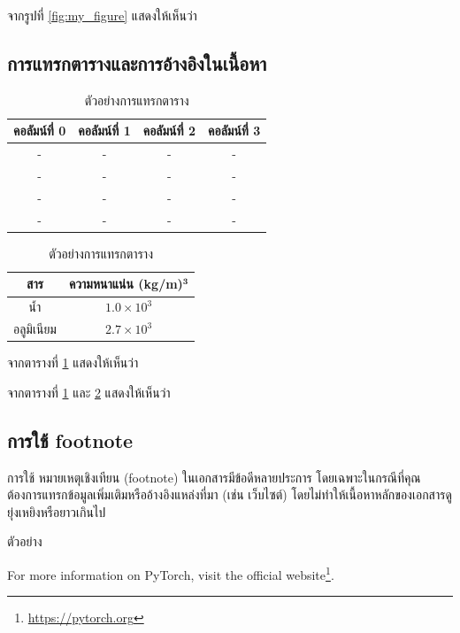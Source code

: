 จากรูปที่ \ref{fig:my_figure} แสดงให้เห็นว่า \dotfill 

\subsection*{การแทรกตารางและการอ้างอิงในเนื้อหา}

\begin{table}[H]
\centering
\caption{ตัวอย่างการแทรกตาราง}
\label{tab:my_label_1}
\begin{tabular}{cccc}
\hline
คอลัมน์ที่ 0 & คอลัมน์ที่ 1 & คอลัมน์ที่ 2  & คอลัมน์ที่ 3 \\ \hline
- & - & - & - \\
- & - & - & - \\
- & - & - & - \\
- & - & - & - \\
\hline
\end{tabular}
\end{table}

\begin{table}[H]
\centering
\caption{ตัวอย่างการแทรกตาราง}
\label{tab:my_label_2}
\begin{tabular}{|c|c|}
\hline
\textbf{สาร} & \textbf{ความหนาแน่น (kg/m)}$^\mathbf{3}$\\ \hline
น้ำ & $1.0\times10^3$ \\ \hline
อลูมิเนียม & $2.7\times10^3$ \\ \hline
\end{tabular}
\end{table}

จากตารางที่ \ref{tab:my_label_1} แสดงให้เห็นว่า \dotfill 

จากตารางที่ \ref{tab:my_label_1} และ \ref{tab:my_label_2} แสดงให้เห็นว่า \dotfill 

\subsection*{การใช้ footnote}
การใช้ หมายเหตุเชิงเทียน (footnote) ในเอกสารมีข้อดีหลายประการ โดยเฉพาะในกรณีที่คุณต้องการแทรกข้อมูลเพิ่มเติมหรืออ้างอิงแหล่งที่มา (เช่น เว็บไซต์) โดยไม่ทำให้เนื้อหาหลักของเอกสารดูยุ่งเหยิงหรือยาวเกินไป

ตัวอย่าง

For more information on PyTorch, visit the official website\footnote{\url{https://pytorch.org}}.
